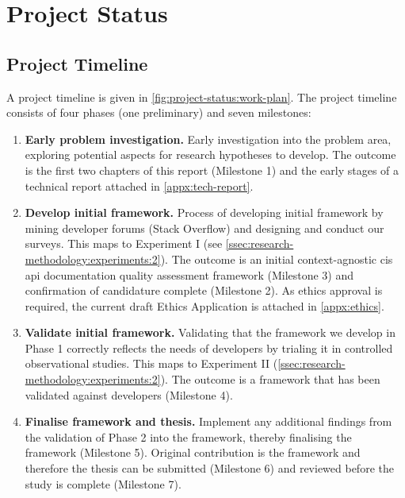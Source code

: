 \chapter{Project Status}
\label{ch:project-status}

\graphicspath{{mainmatter/project-status/figures/}}

\section{Project Timeline}

A project timeline is given in \cref{fig:project-status:work-plan}. The project timeline consists of four phases (one preliminary) and seven milestones:

\bigskip
\begin{enumerate}[label=\textbf{Phase \arabic*.},start=0,leftmargin=2.5cm]
  \item \textbf{Early problem investigation.} Early investigation into the problem area, exploring potential aspects for research hypotheses to develop. The outcome is the first two chapters of this report (Milestone 1) and the early stages of a technical report attached in \cref{appx:tech-report}.
  \item \textbf{Develop initial framework.} Process of developing initial framework by mining developer forums (Stack Overflow) and designing and conduct our surveys. This maps to Experiment I (see \cref{ssec:research-methodology:experiments:2}). The outcome is an initial context-agnostic \gls{cis} \gls{api} documentation quality assessment framework (Milestone 3) and confirmation of candidature complete (Milestone 2). As ethics approval is required, the current draft Ethics Application is attached in \cref{appx:ethics}.
  \item \textbf{Validate initial framework.} Validating that the framework we develop in Phase 1 correctly reflects the needs of developers by trialing it in controlled observational studies. This maps to Experiment II (\cref{ssec:research-methodology:experiments:2}). The outcome is a framework that has been validated against developers (Milestone 4).
  \item \textbf{Finalise framework and thesis.} Implement any additional findings from the validation of Phase 2 into the framework, thereby finalising the framework (Milestone 5). Original contribution is the framework and therefore the thesis can be submitted (Milestone 6) and reviewed before the study is complete (Milestone 7).
\end{enumerate}

